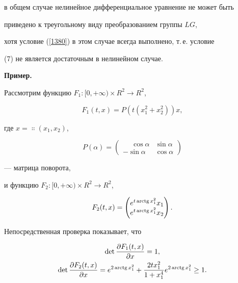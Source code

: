в общем случае нелинейное дифференциальное уравнение не может быть


приведено к треугольному виду преобразованием группы $LG$,


хотя условие (\ref{1380}) в этом случае всегда выполнено, т.\,е. условие


(7) не является достаточным в нелинейном случае.


\medskip





{\bf Пример.}


Рассмотрим функцию $F_{1}:[0,+\infty)\times R^{2}\rightarrow R^{2}$,


$$


F_{1}(t,x)=P(t(x_{1}^{2}+x_{2}^{2}))x,


$$


где $x=\Colon(x_{1},x_{2})$, 


$$


P(\alpha)=


\begin{pmatrix}


\phantom{-}\cos{\alpha} & \sin{\alpha} \\


-\sin{\alpha} & \cos{\alpha}


\end{pmatrix}


$$


--- матрица поворота,


и функцию $F_{2}:[0,+\infty)\times R^{2} \rightarrow R^{2}$,


$$


F_{2}(t,x)=


\begin{pmatrix}


e^{t \arctg{x_{1}^{2}}}x_{1} \\


e^{t \arctg{x_{1}^{2}}}x_{2}


\end{pmatrix}


.


$$





Непосредственная проверка показывает, что


\begin{gather}


\label{2}


\det{\frac{\partial F_{1}(t,x)}{\partial x}}=1, \\


%


\label{3}


\det{\frac{\partial F_{2}(t,x)}{\partial x}}=e^{2\arctg x_{1}^{2}}+


\frac{2tx_{1}^{2}}{1+x_{1}^{4}}e^{2\arctg x_{1}^{2}}\geq 1.


\end{gather}





